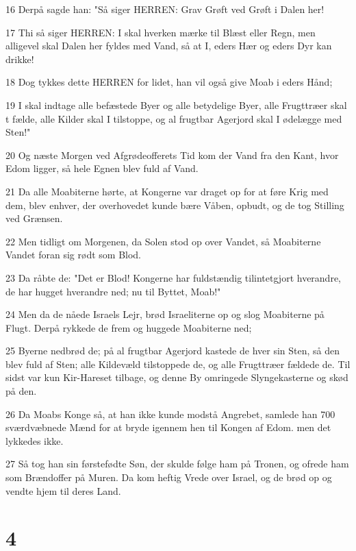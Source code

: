 \par 16 Derpå sagde han: "Så siger HERREN: Grav Grøft ved Grøft i Dalen her!
\par 17 Thi så siger HERREN: I skal hverken mærke til Blæst eller Regn, men alligevel skal Dalen her fyldes med Vand, så at I, eders Hær og eders Dyr kan drikke!
\par 18 Dog tykkes dette HERREN for lidet, han vil også give Moab i eders Hånd;
\par 19 I skal indtage alle befæstede Byer og alle betydelige Byer, alle Frugttræer skal t fælde, alle Kilder skal I tilstoppe, og al frugtbar Agerjord skal I ødelægge med Sten!"
\par 20 Og næste Morgen ved Afgrødeofferets Tid kom der Vand fra den Kant, hvor Edom ligger, så hele Egnen blev fuld af Vand.
\par 21 Da alle Moabiterne hørte, at Kongerne var draget op for at føre Krig med dem, blev enhver, der overhovedet kunde bære Våben, opbudt, og de tog Stilling ved Grænsen.
\par 22 Men tidligt om Morgenen, da Solen stod op over Vandet, så Moabiterne Vandet foran sig rødt som Blod.
\par 23 Da råbte de: "Det er Blod! Kongerne har fuldstændig tilintetgjort hverandre, de har hugget hverandre ned; nu til Byttet, Moab!"
\par 24 Men da de nåede Israels Lejr, brød Israeliterne op og slog Moabiterne på Flugt. Derpå rykkede de frem og huggede Moabiterne ned;
\par 25 Byerne nedbrød de; på al frugtbar Agerjord kastede de hver sin Sten, så den blev fuld af Sten; alle Kildevæld tilstoppede de, og alle Frugttræer fældede de. Til sidst var kun Kir-Hareset tilbage, og denne By omringede Slyngekasterne og skød på den.
\par 26 Da Moabs Konge så, at han ikke kunde modstå Angrebet, samlede han 700 sværdvæbnede Mænd for at bryde igennem hen til Kongen af Edom. men det lykkedes ikke.
\par 27 Så tog han sin førstefødte Søn, der skulde følge ham på Tronen, og ofrede ham som Brændoffer på Muren. Da kom heftig Vrede over Israel, og de brød op og vendte hjem til deres Land.

\chapter{4}

